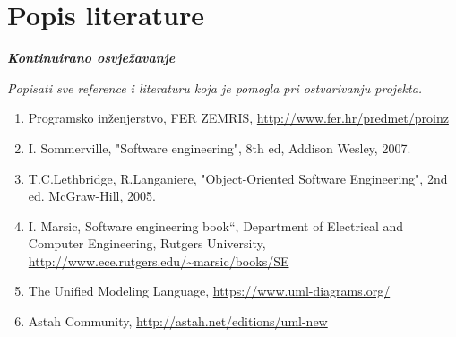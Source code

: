 \chapter{Popis literature}
	 	
 		\textbf{\textit{Kontinuirano osvježavanje}}
	
		\textit{Popisati sve reference i literaturu koja je pomogla pri ostvarivanju projekta.}
		
		
		\begin{enumerate}
			
			
			\item  Programsko inženjerstvo, FER ZEMRIS, \url{http://www.fer.hr/predmet/proinz}
			
			\item  I. Sommerville, "Software engineering", 8th ed, Addison Wesley, 2007.
			
			\item  T.C.Lethbridge, R.Langaniere, "Object-Oriented Software Engineering", 2nd ed. McGraw-Hill, 2005.
			
			\item  I. Marsic, Software engineering book``, Department of Electrical and Computer Engineering, Rutgers University, \url{http://www.ece.rutgers.edu/~marsic/books/SE}
			
			\item  The Unified Modeling Language, \url{https://www.uml-diagrams.org/}
			
			\item  Astah Community, \url{http://astah.net/editions/uml-new}
		\end{enumerate}
		
		 
